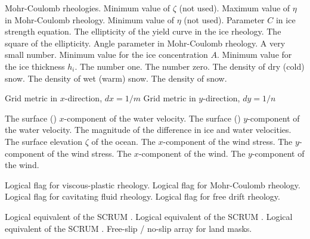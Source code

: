 \begin{klist}
\begin{klist}
    Mohr-Coulomb rheologies.
     Minimum value of $\zeta$ (not used).
     Maximum value of $\eta$ in Mohr-Coulomb rheology.
     Minimum value of $\eta$ (not used).
     Parameter $C$ in ice strength equation.
       The ellipticity of the yield curve in the ice
  rheology.
      The square of the ellipticity.
      Angle parameter in Mohr-Coulomb rheology.
       A very small number.
      Minimum value for the ice concentration $A$.
      Minimum value for the ice thickness $h_i$.
       The number one.
      The number zero.
      The density of dry (cold) snow.
      The density of wet (warm) snow.
      The density of snow.
  \end{klist}
   \mbox{}
  \begin{klist}
       Grid metric in $x$-direction, $dx = 1 / m$
       Grid metric in $y$-direction, $dy = 1 / n$
  \end{klist}
   \mbox{}
  \begin{klist}
         The surface () $x$-component of
  the water velocity.
         The surface () $y$-component of
  the water velocity.
          The magnitude of the difference in ice and
  water velocities.
         The surface elevation $\zeta$ of the ocean.
          The $x$-component of the wind stress.
          The $y$-component of the wind stress.
          The $x$-component of the wind.
          The $y$-component of the wind.
  \end{klist}
   \mbox{}
  \begin{klist}
       Logical flag for viscous-plastic rheology.
       Logical flag for Mohr-Coulomb rheology.
       Logical flag for cavitating fluid rheology.
       Logical flag for free drift rheology.
  \end{klist}
   \mbox{}
  \begin{klist}
          Logical equivalent of the SCRUM .
          Logical equivalent of the SCRUM .
          Logical equivalent of the SCRUM .
         Free-slip / no-slip array for land masks.

\end{klist}
\end{klist}
